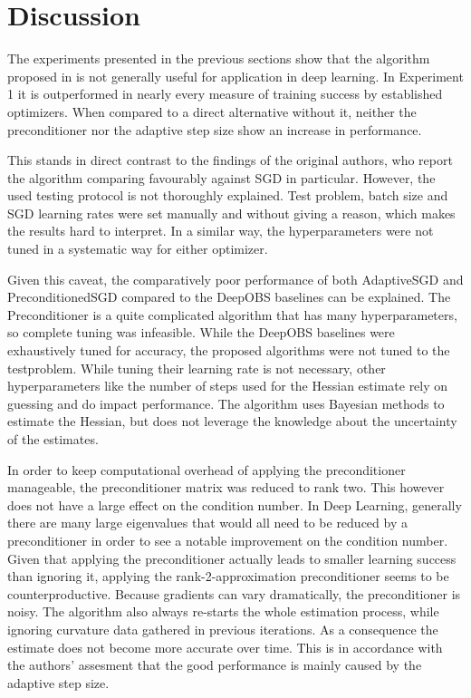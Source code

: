 \documentclass[twoside,12pt,a4paper]{report}
\begin{document}
\section{Discussion}
The experiments presented in the previous sections show that the algorithm proposed in \cite{roos2019active} is not generally useful for application in deep learning. In Experiment 1 it is outperformed in nearly every measure of training success by established optimizers. When compared to a direct alternative without it, neither the preconditioner nor the adaptive step size show an increase in performance.

This stands in direct contrast to the findings of the original authors, who report the algorithm comparing favourably against SGD in particular. However, the used testing protocol is not thoroughly explained. Test problem, batch size and SGD learning rates were set manually and without giving a reason, which makes the results hard to interpret. In a similar way, the hyperparameters were not tuned in a systematic way for either optimizer.

Given this caveat, the comparatively poor performance of both AdaptiveSGD and PreconditionedSGD compared to the DeepOBS baselines can be explained. The Preconditioner is a quite complicated algorithm that has many hyperparameters, so complete tuning was infeasible. While the DeepOBS baselines were exhaustively tuned for accuracy, the proposed algorithms were not tuned to the testproblem. While tuning their learning rate is not necessary, other hyperparameters like the number of steps used for the Hessian estimate rely on guessing and do impact performance. The algorithm uses Bayesian methods to estimate the Hessian, but does not leverage the knowledge about the uncertainty of the estimates.

In order to keep computational overhead of applying the preconditioner manageable, the preconditioner matrix was reduced to rank two. This however does not have a large effect on the condition number. In Deep Learning, generally there are many large eigenvalues that would all need to be reduced by a preconditioner in order to see a notable improvement on the condition number. Given that applying the preconditioner actually leads to smaller learning success than ignoring it, applying the rank-2-approximation preconditioner seems to be counterproductive. Because gradients can vary dramatically, the preconditioner is noisy. The algorithm also always re-starts the whole estimation process, while ignoring curvature data gathered in previous iterations. As a consequence the estimate does not become more accurate over time. This is in accordance with the authors' assesment that the good performance is mainly caused by the adaptive step size.
\end{document}
